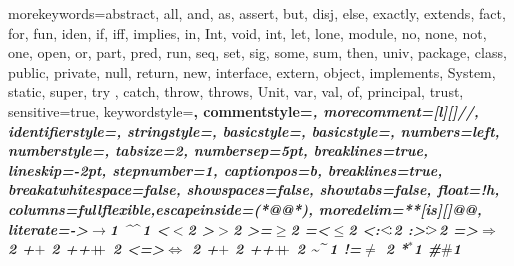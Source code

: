 {morekeywords={abstract, all, and, as, assert, but, disj, else, exactly, extends, fact, for, fun, iden, if, iff, implies, in, Int, void, int, let, lone, module, no, none, not, one, open, or, part, pred, run, seq, set, sig, some, sum, then, univ, package, class, public, private, null, return, new, interface, extern, object, implements, System, static, super, try , catch, throw, throws, Unit, var, val, of, principal, trust},
sensitive=true,
keywordstyle=\bfseries\color{\neutcol},
commentstyle=\itshape\color{purple!40!black},
morecomment=[l][\small\itshape\color{purple!40!black}]{//},
identifierstyle=\color{\neutcol},
stringstyle=\color{orange},
basicstyle=\small,
basicstyle={\small\ttfamily},
numbers=left,
numberstyle=\tiny\color{mygray},
tabsize=2,
numbersep=5pt,
breaklines=true,
lineskip=-2pt,
stepnumber=1,
captionpos=b,
breaklines=true,
breakatwhitespace=false,
showspaces=false,
showtabs=false,
float=!h,
columns=fullflexible,escapeinside={(*@}{@*)},
moredelim=**[is][\color{red!60}]{@}{@},
literate={->}{{$\to$}}1 {^}{{$\mspace{-3mu}\widehat{\quad}\mspace{-3mu}$}}1
{<}{$<$}2 {>}{$>$}2 {>=}{$\geq$}2 {=<}{$\leq$}2
{<:}{{$<\mspace{-3mu}:$}}2 {:>}{{$:\mspace{-3mu}>$}}2
{=>}{{$\Rightarrow$ }}2 {+}{$+$ }2 {++}{{$+\mspace{-8mu}+$ }}2
{<=>}{{$\Leftrightarrow$ }}2 {+}{$+$ }2 {++}{{$+\mspace{-8mu}+$ }}2
{\~}{{$\mspace{-3mu}\widetilde{\quad}\mspace{-3mu}$}}1
{!=}{$\neq$ }2 {*}{${}^{\ast}$}1 %
{\#}{$\#$}1
}

